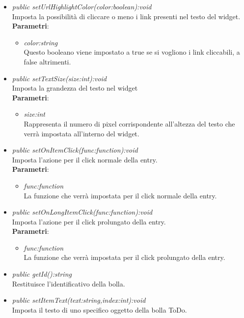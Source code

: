 \begin{itemize}
\begin{itemize}
\begin{itemize}
\item \textit{public setUrlHighlightColor(color:boolean):void}\\
	Imposta la possibilità di cliccare o meno i link presenti nel testo del widget.
		\\ \textbf{Parametri}: \begin{itemize}
		\item \textit{color:string}\\
		Questo booleano viene impostato a true se si vogliono i link cliccabili, a false altrimenti.
		\end{itemize} 
\item \textit{public setTextSize(size:int):void}\\
	Imposta la grandezza del testo nel widget
		\\ \textbf{Parametri}: \begin{itemize}
		\item \textit{size:int}\\
		Rappresenta il numero di pixel corrispondente all'altezza del testo che verrà impostata all'interno del widget.
		\end{itemize}
\item \textit{public setOnItemClick(func:function):void}\\
	Imposta l'azione per il click normale della entry.
		\\ \textbf{Parametri}: \begin{itemize}
		\item \textit{func:function}\\
		La funzione che verrà impostata per il click normale della entry.
		\end{itemize} 
\item \textit{public setOnLongItemClick(func:function):void}\\
	Imposta l'azione per il click prolungato della entry.	
		\\ \textbf{Parametri}: \begin{itemize}
		\item \textit{func:function}\\
		La funzione che verrà impostata per il click prolungato della entry.
		\end{itemize}
\item \textit{public getId():string}\\
Restituisce l'identificativo della bolla.
\item \textit{public setItemText(text:string,index:int):void}\\
	Imposta il testo di uno specifico oggetto della bolla ToDo.

\end{itemize}
\end{itemize}
\end{itemize}
